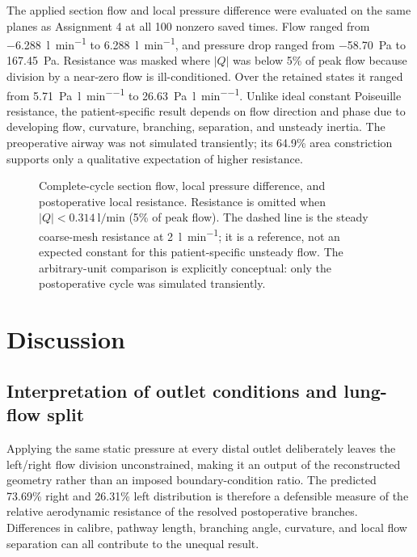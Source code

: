 \documentclass[11pt,a4paper]{article}
\begin{document}
The applied section flow and local pressure difference were evaluated on the
same planes as Assignment 4 at all 100 nonzero saved times. Flow ranged from
\SI{-6.288}{\litre\per\minute} to \SI{6.288}{\litre\per\minute}, and pressure
drop ranged from \SI{-58.70}{\pascal} to \SI{167.45}{\pascal}. Resistance was
masked where $|Q|$ was below 5\% of peak flow because division by a near-zero
flow is ill-conditioned. Over the retained states it ranged from
\SI{5.71}{\pascal\per\litre\per\minute} to
\SI{26.63}{\pascal\per\litre\per\minute}. Unlike ideal constant Poiseuille
resistance, the patient-specific result depends on flow direction and phase due
to developing flow, curvature, branching, separation, and unsteady inertia.
The preoperative airway was not simulated transiently; its 64.9\% area
constriction supports only a qualitative expectation of higher resistance.

\begin{figure}[htbp]
  \centering
  \resizebox{0.92\textwidth}{!}{}
  \caption{Complete-cycle section flow, local pressure difference, and
  postoperative local resistance. Resistance is omitted when
  $|Q|<\SI{0.314}{\litre\per\minute}$ (5\% of peak flow). The dashed line is the
  steady coarse-mesh resistance at \SI{2}{\litre\per\minute}; it is a reference,
  not an expected constant for this patient-specific unsteady flow. The
  arbitrary-unit comparison is explicitly conceptual: only the postoperative
  cycle was simulated transiently.}
  \label{fig:transient_resistance}
\end{figure}

\section{Discussion}
\label{sec:discussion}

\subsection{Interpretation of outlet conditions and lung-flow split}

Applying the same static pressure at every distal outlet deliberately leaves the
left/right flow division unconstrained, making it an output of the reconstructed
geometry rather than an imposed boundary-condition ratio. The predicted
73.69\% right and 26.31\% left distribution is therefore a defensible measure of
the relative aerodynamic resistance of the resolved postoperative branches.
Differences in calibre, pathway length, branching angle, curvature, and local
flow separation can all contribute to the unequal result.
\end{document}
